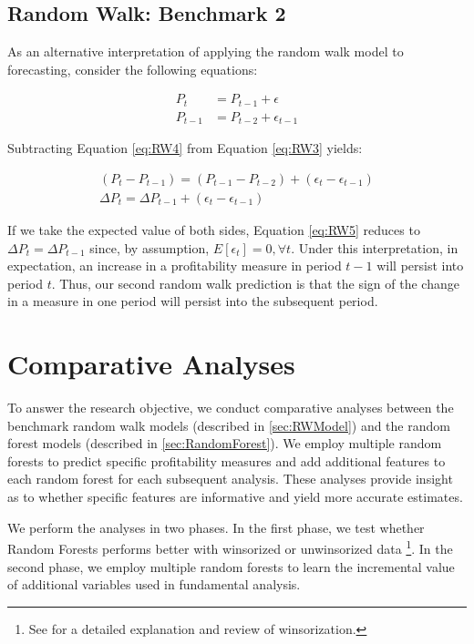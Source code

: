 \subsection{Random Walk: Benchmark 2}

As an alternative interpretation of applying the random walk model to forecasting, consider the following equations:

\begin{align}
	P_t &= P_{t-1} + \epsilon \label{eq:RW3}\\
	P_{t-1} &= P_{t-2} + \epsilon_{t-1} \label{eq:RW4}
\end{align}

\noindent Subtracting Equation \ref{eq:RW4} from Equation \ref{eq:RW3} yields:

\begin{align}
(P_t - P_{t-1}) = (P_{t-1} - P_{t-2}) + (\epsilon_t - \epsilon_{t-1}) \nonumber \\
\Delta P_t = \Delta P_{t-1} + (\epsilon_t - \epsilon_{t-1}) \label{eq:RW5}
\end{align}

If we take the expected value of both sides,  Equation \ref{eq:RW5} reduces to  \(\Delta P_t = \Delta P_{t-1}\) since, by assumption, \(E[\epsilon_t] = 0, \forall t \). Under this interpretation, in expectation, an increase in a profitability measure in period \(t-1\) will persist into period \(t\). Thus, our second random walk prediction is that the sign of the change in a measure in one period will persist into the subsequent period.


\section{Comparative Analyses} \label{sec:CAnalyses}

To answer the research objective,  we conduct comparative analyses between the benchmark random walk models (described in \ref{sec:RWModel}) and the random forest models (described in \ref{sec:RandomForest}). We employ multiple random forests to predict specific profitability measures and add additional features to each random forest for each subsequent analysis. These analyses provide insight as to whether specific features are informative and yield more accurate estimates.

We perform the analyses in two phases.  In the first phase,  we test whether Random Forests performs better with winsorized or unwinsorized data \footnote{See \cite{winsor} for a detailed explanation and review of winsorization.}.  In the second phase, we employ multiple random forests to learn the incremental value of additional variables used in fundamental analysis. 

